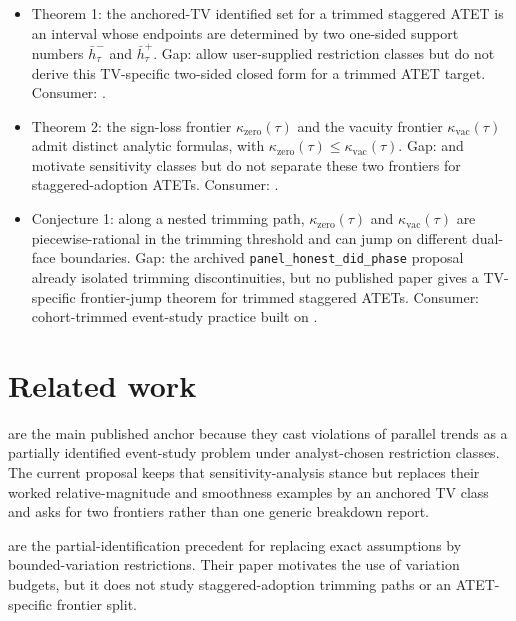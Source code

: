 \documentclass[11pt]{article}
\theoremstyle{definition}
\theoremstyle{plain}
\theoremstyle{remark}
\begin{document}
\begin{itemize}[leftmargin=*]
\item Theorem 1: the anchored-TV identified set for a trimmed staggered ATET is an interval whose endpoints are determined by two one-sided support numbers \(\bar h_\tau^{-}\) and \(\bar h_\tau^{+}\). Gap: \citet{RambachanRoth2023CrediblePT} allow user-supplied restriction classes but do not derive this TV-specific two-sided closed form for a trimmed ATET target. Consumer: \citet{RothSantAnnaBilinskiPoe2023TrendingDiD}.
\item Theorem 2: the sign-loss frontier \(\kappa_{\mathrm{zero}}(\tau)\) and the vacuity frontier \(\kappa_{\mathrm{vac}}(\tau)\) admit distinct analytic formulas, with \(\kappa_{\mathrm{zero}}(\tau)\le \kappa_{\mathrm{vac}}(\tau)\). Gap: \citet{RambachanRoth2023CrediblePT} and \citet{ManskiPepper2018BoundedVariation} motivate sensitivity classes but do not separate these two frontiers for staggered-adoption ATETs. Consumer: \citet{CallawaySantAnna2021MultiplePeriods}.
\item Conjecture 1: along a nested trimming path, \(\kappa_{\mathrm{zero}}(\tau)\) and \(\kappa_{\mathrm{vac}}(\tau)\) are piecewise-rational in the trimming threshold and can jump on different dual-face boundaries. Gap: the archived \texttt{panel\_honest\_did\_phase} proposal already isolated trimming discontinuities, but no published paper gives a TV-specific frontier-jump theorem for trimmed staggered ATETs. Consumer: cohort-trimmed event-study practice built on \citet{BorusyakJaravelSpiess2024EventStudies}.
\end{itemize}

\section{Related work}
\citet{RambachanRoth2023CrediblePT} are the main published anchor because they cast violations of parallel trends as a partially identified event-study problem under analyst-chosen restriction classes. The current proposal keeps that sensitivity-analysis stance but replaces their worked relative-magnitude and smoothness examples by an anchored TV class and asks for two frontiers rather than one generic breakdown report.

\citet{ManskiPepper2018BoundedVariation} are the partial-identification precedent for replacing exact assumptions by bounded-variation restrictions. Their paper motivates the use of variation budgets, but it does not study staggered-adoption trimming paths or an ATET-specific frontier split.
\end{document}
